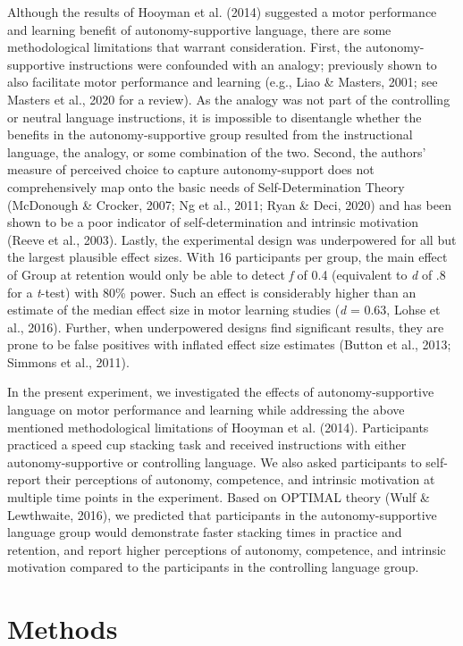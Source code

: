\documentclass[
  man, donotrepeattitle,mask,floatsintext]{apa7}
\begin{document}
Although the results of Hooyman et al. (2014) suggested a motor performance and learning benefit of autonomy-supportive language, there are some methodological limitations that warrant consideration. First, the autonomy-supportive instructions were confounded with an analogy; previously shown to also facilitate motor performance and learning (e.g., Liao \& Masters, 2001; see Masters et al., 2020 for a review). As the analogy was not part of the controlling or neutral language instructions, it is impossible to disentangle whether the benefits in the autonomy-supportive group resulted from the instructional language, the analogy, or some combination of the two. Second, the authors' measure of perceived choice to capture autonomy-support does not comprehensively map onto the basic needs of Self-Determination Theory (McDonough \& Crocker, 2007; Ng et al., 2011; Ryan \& Deci, 2020) and has been shown to be a poor indicator of self-determination and intrinsic motivation (Reeve et al., 2003). Lastly, the experimental design was underpowered for all but the largest plausible effect sizes. With 16 participants per group, the main effect of Group at retention would only be able to detect \emph{f} of 0.4 (equivalent to \emph{d} of .8 for a \emph{t}-test) with 80\% power. Such an effect is considerably higher than an estimate of the median effect size in motor learning studies (\emph{d} = 0.63, Lohse et al., 2016). Further, when underpowered designs find significant results, they are prone to be false positives with inflated effect size estimates (Button et al., 2013; Simmons et al., 2011).

In the present experiment, we investigated the effects of autonomy-supportive language on motor performance and learning while addressing the above mentioned methodological limitations of Hooyman et al. (2014). Participants practiced a speed cup stacking task and received instructions with either autonomy-supportive or controlling language. We also asked participants to self-report their perceptions of autonomy, competence, and intrinsic motivation at multiple time points in the experiment. Based on OPTIMAL theory (Wulf \& Lewthwaite, 2016), we predicted that participants in the autonomy-supportive language group would demonstrate faster stacking times in practice and retention, and report higher perceptions of autonomy, competence, and intrinsic motivation compared to the participants in the controlling language group.

\hypertarget{methods}{%
\section{Methods}\label{methods}}
\end{document}
